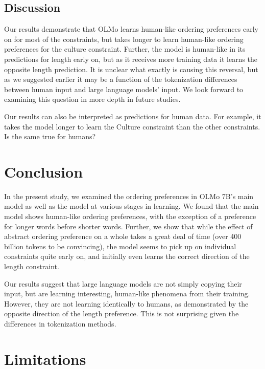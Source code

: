 \documentclass[
  nottoc]{article}
\begin{document}
\subsection{Discussion}\label{discussion-1}

Our results demonstrate that OLMo learns human-like ordering preferences
early on for most of the constraints, but takes longer to learn
human-like ordering preferences for the culture constraint. Further, the
model is human-like in its predictions for length early on, but as it
receives more training data it learns the opposite length prediction. It
is unclear what exactly is causing this reversal, but as we suggested
earlier it may be a function of the tokenization differences between
human input and large language models' input. We look forward to
examining this question in more depth in future studies.

Our results can also be interpreted as predictions for human data. For
example, it takes the model longer to learn the Culture constraint than
the other constraints. Is the same true for humans?

\section{Conclusion}\label{conclusion}

In the present study, we examined the ordering preferences in OLMo 7B's
main model as well as the model at various stages in learning. We found
that the main model shows human-like ordering preferences, with the
exception of a preference for longer words before shorter words.
Further, we show that while the effect of abstract ordering preference
on a whole takes a great deal of time (over 400 billion tokens to be
convincing), the model seems to pick up on individual constraints quite
early on, and initially even learns the correct direction of the length
constraint.

Our results suggest that large language models are not simply copying
their input, but are learning interesting, human-like phenomena from
their training. However, they are not learning identically to humans, as
demonstrated by the opposite direction of the length preference. This is
not surprising given the differences in tokenization methods.

\section{Limitations}\label{limitations}
\end{document}
